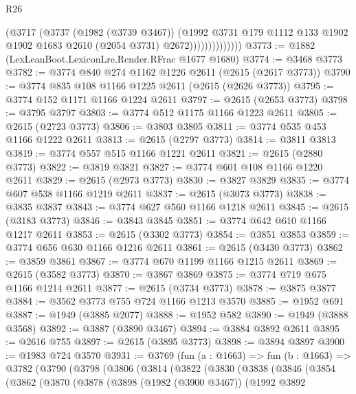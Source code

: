\begin{lexlean}{R26}
\begin{coremodule}
                          (@3717
                            (@3737
                              (@1982 (@3739 @3467))
                              (@1992
                                @3731
                                @179
                                @1112
                                @133
                                @1902
                                @1902
                                @1683
                                @2610
                                (@2054 @3731)
                                @2672))))))))))))))
@3773 := @1882 (LexLeanBoot.LexiconLre.Render.RFrac @1677 @1680)
@3774 := @3468 @3773
@3782 := @3774 @840 @274 @1162 @1226 @2611 (@2615 (@2617 @3773))
@3790 := @3774 @835 @108 @1166 @1225 @2611 (@2615 (@2626 @3773))
@3795 := @3774 @152 @1171 @1166 @1224 @2611
@3797 := @2615 (@2653 @3773)
@3798 := @3795 @3797
@3803 := @3774 @512 @1175 @1166 @1223 @2611
@3805 := @2615 (@2723 @3773)
@3806 := @3803 @3805
@3811 := @3774 @535 @453 @1166 @1222 @2611
@3813 := @2615 (@2797 @3773)
@3814 := @3811 @3813
@3819 := @3774 @557 @515 @1166 @1221 @2611
@3821 := @2615 (@2880 @3773)
@3822 := @3819 @3821
@3827 := @3774 @601 @108 @1166 @1220 @2611
@3829 := @2615 (@2973 @3773)
@3830 := @3827 @3829
@3835 := @3774 @607 @538 @1166 @1219 @2611
@3837 := @2615 (@3073 @3773)
@3838 := @3835 @3837
@3843 := @3774 @627 @560 @1166 @1218 @2611
@3845 := @2615 (@3183 @3773)
@3846 := @3843 @3845
@3851 := @3774 @642 @610 @1166 @1217 @2611
@3853 := @2615 (@3302 @3773)
@3854 := @3851 @3853
@3859 := @3774 @656 @630 @1166 @1216 @2611
@3861 := @2615 (@3430 @3773)
@3862 := @3859 @3861
@3867 := @3774 @670 @1199 @1166 @1215 @2611
@3869 := @2615 (@3582 @3773)
@3870 := @3867 @3869
@3875 := @3774 @719 @675 @1166 @1214 @2611
@3877 := @2615 (@3734 @3773)
@3878 := @3875 @3877
@3884 := @3562 @3773 @755 @724 @1166 @1213 @3570
@3885 := @1952 @691
@3887 := @1949 (@3885 @2077)
@3888 := @1952 @582
@3890 := @1949 (@3888 @3568)
@3892 := @3887 (@3890 @3467)
@3894 := @3884 @3892 @2611
@3895 := @2616 @755
@3897 := @2615 (@3895 @3773)
@3898 := @3894 @3897
@3900 := @1983 @724 @3570
@3931 := @3769
    (fun (a : @1663) =>
    fun (b : @1663) =>
    @3782
      (@3790
        (@3798
          (@3806
            (@3814
              (@3822
                (@3830
                  (@3838
                    (@3846
                      (@3854
                        (@3862
                          (@3870
                            (@3878
                              (@3898
                                (@1982 (@3900 @3467))
                                (@1992
                                  @3892

\end{coremodule}
\end{lexlean}
